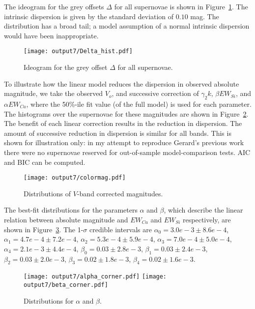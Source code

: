 \documentclass[11pt, oneside]{article}   	%
\begin{document}
The ideogram for the grey offsets $\Delta$ for all supernovae is shown in Figure~\ref{Delta_hist:fig}.  The intrinsic dispersion
is given by the standard deviation of $0.10$ mag.  The distribution has a broad tail; a model assumption of a normal intrinsic dispersion
would have been inappropriate.
\begin{figure}[htbp] %
   \centering
   \texttt{[image: output7/Delta\_hist.pdf]} 
   \caption{Ideogram for the grey offset $\Delta$ for all supernovae.}
   \label{Delta_hist:fig}
\end{figure}


To illustrate how the linear model reduces the dispersion in observed absolute magnitude, we take the
observed $V_o$, and successive correction of $\gamma_2k$,  $\beta EW_{Si}$, and  $\alpha EW_{Ca}$, 
where the 50\%-ile fit value (of the full model) is used for each parameter.  The histograms over the supernovae for these magnitudes are shown in
Figure~\ref{magresidual:fig}.  The benefit of each  linear correction results in the reduction in dispersion.  The amount
of successive reduction in dispersion is similar for all bands.  This is shown for illustration only: in my attempt to reproduce Gerard's previous
work there were no supernovae reserved for out-of-sample model-comparison tests.  AIC and BIC can be computed.
\begin{figure}[htbp] %
   \centering
   \texttt{[image: output7/colormag.pdf]} 
   \caption{Distributions of $V$-band corrected magnitudes.}
   \label{magresidual:fig}
\end{figure}

The best-fit distributions for the parameters $\alpha$ and $\beta$, which describe the linear relation between absolute magnitude
and $EW_{Ca}$ and $EW_{Si}$ respectively, are shown in Figure~\ref{alphabeta:fig}.  The 1-$\sigma$ 
credible intervals are $\alpha_0=3.0e-3 \pm 8.6e-4$,
$\alpha_1 = 4.7e-4  \pm 7.2e-4$, $\alpha_2 = 5.3e-4  \pm 5.9e-4$, $\alpha_3 = 7.0e-4  \pm 5.0e-4$,
$\alpha_4 = 2.1e-3  \pm 4.4e-4$,  $\beta_0=0.03  \pm 2.8e-3$,
$\beta_1 =0.03  \pm 2.4e-3$, $\beta_2 = 0.03  \pm 2.0e-3$, $\beta_3 =0.02  \pm 1.8e-3$,
$\beta_4 =0.02  \pm 1.6e-3$.
\begin{figure}[htbp] %
   \centering
   \texttt{[image: output7/alpha\_corner.pdf]} 
   \texttt{[image: output7/beta\_corner.pdf]} 
   \caption{Distributions for $\alpha$ and $\beta$.}
   \label{alphabeta:fig}
\end{figure}
\end{document}
